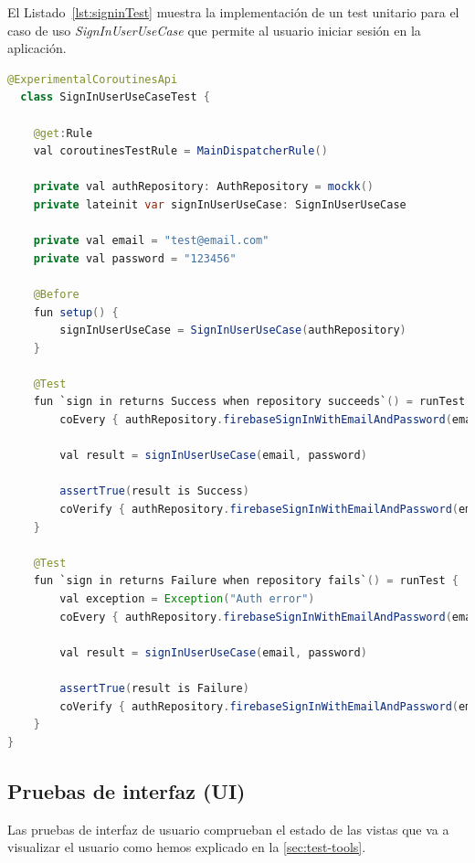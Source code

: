 El Listado~\ref{lst:signinTest} muestra la implementación de un test unitario para el caso de uso \textit{SignInUserUseCase} que permite al usuario iniciar sesión en la aplicación.

\begin{lstlisting}[language=Java, caption={SignInUserUseCaseTest}, label={lst:signinTest}]
  @ExperimentalCoroutinesApi
  class SignInUserUseCaseTest {

    @get:Rule
    val coroutinesTestRule = MainDispatcherRule()

    private val authRepository: AuthRepository = mockk()
    private lateinit var signInUserUseCase: SignInUserUseCase

    private val email = "test@email.com"
    private val password = "123456"

    @Before
    fun setup() {
        signInUserUseCase = SignInUserUseCase(authRepository)
    }

    @Test
    fun `sign in returns Success when repository succeeds`() = runTest {
        coEvery { authRepository.firebaseSignInWithEmailAndPassword(email, password) } returns Success(true)

        val result = signInUserUseCase(email, password)

        assertTrue(result is Success)
        coVerify { authRepository.firebaseSignInWithEmailAndPassword(email, password) }
    }

    @Test
    fun `sign in returns Failure when repository fails`() = runTest {
        val exception = Exception("Auth error")
        coEvery { authRepository.firebaseSignInWithEmailAndPassword(email, password) } returns Failure(exception)

        val result = signInUserUseCase(email, password)

        assertTrue(result is Failure)
        coVerify { authRepository.firebaseSignInWithEmailAndPassword(email, password) }
    }
}
\end{lstlisting}

\subsection{Pruebas de interfaz (UI)}

Las pruebas de interfaz de usuario comprueban el estado de las vistas que va a visualizar el usuario como hemos explicado en la \autoref{sec:test-tools}.
